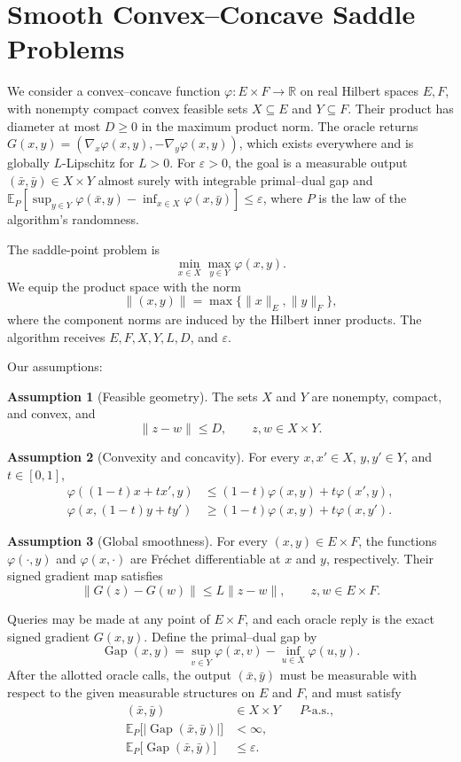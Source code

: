 \documentclass[10pt]{article}
\theoremstyle{definition}
\newtheorem{assumption}{Assumption}
\begin{document}
\section*{Smooth Convex--Concave Saddle Problems}
We consider a convex--concave function $\varphi:E\times F\to\mathbb{R}$ on real Hilbert spaces $E,F$, with nonempty compact convex feasible sets $X\subseteq E$ and $Y\subseteq F$. Their product has diameter at most $D\geq0$ in the maximum product norm. The oracle returns $G(x,y)=(\nabla_x\varphi(x,y),-\nabla_y\varphi(x,y))$, which exists everywhere and is globally $L$-Lipschitz for $L>0$. For $\varepsilon>0$, the goal is a measurable output $(\bar{x},\bar{y})\in X\times Y$ almost surely with integrable primal--dual gap and $\mathbb{E}_{P}[\sup_{y\in Y}\varphi(\bar{x},y)-\inf_{x\in X}\varphi(x,\bar{y})]\leq\varepsilon$, where $P$ is the law of the algorithm's randomness.

The saddle-point problem is
\[
\min_{x\in X}\max_{y\in Y}\varphi(x,y).
\]
We equip the product space with the norm
\[
\|(x,y)\|=\max\{\|x\|_E,\|y\|_F\},
\]
where the component norms are induced by the Hilbert inner products. The algorithm receives $E,F,X,Y,L,D$, and $\varepsilon$.

Our assumptions:
\begin{assumption}[Feasible geometry]
The sets $X$ and $Y$ are nonempty, compact, and convex, and
\[
\|z-w\|\leq D,
\qquad z,w\in X\times Y.
\]
\end{assumption}

\begin{assumption}[Convexity and concavity]
For every $x,x'\in X$, $y,y'\in Y$, and $t\in[0,1]$,
\[
\begin{aligned}
\varphi((1-t)x+tx',y)
&\leq (1-t)\varphi(x,y)+t\varphi(x',y),\\
\varphi(x,(1-t)y+ty')
&\geq (1-t)\varphi(x,y)+t\varphi(x,y').
\end{aligned}
\]
\end{assumption}

\begin{assumption}[Global smoothness]
For every $(x,y)\in E\times F$, the functions $\varphi(\cdot,y)$ and $\varphi(x,\cdot)$ are Fr\'echet differentiable at $x$ and $y$, respectively. Their signed gradient map satisfies
\[
\|G(z)-G(w)\|\leq L\|z-w\|,
\qquad z,w\in E\times F.
\]
\end{assumption}

Queries may be made at any point of $E\times F$, and each oracle reply is the exact signed gradient $G(x,y)$. Define the primal--dual gap by
\[
\operatorname{Gap}(x,y)
=\sup_{v\in Y}\varphi(x,v)
-\inf_{u\in X}\varphi(u,y).
\]
After the allotted oracle calls, the output $(\bar{x},\bar{y})$ must be measurable with respect to the given measurable structures on $E$ and $F$, and must satisfy
\[
\begin{aligned}
(\bar{x},\bar{y})&\in X\times Y
&&P\text{-a.s.},\\
\mathbb{E}_{P}\bigl[|\operatorname{Gap}(\bar{x},\bar{y})|\bigr]&<\infty,\\
\mathbb{E}_{P}\bigl[\operatorname{Gap}(\bar{x},\bar{y})\bigr]&\leq\varepsilon.
\end{aligned}
\]
\end{document}
